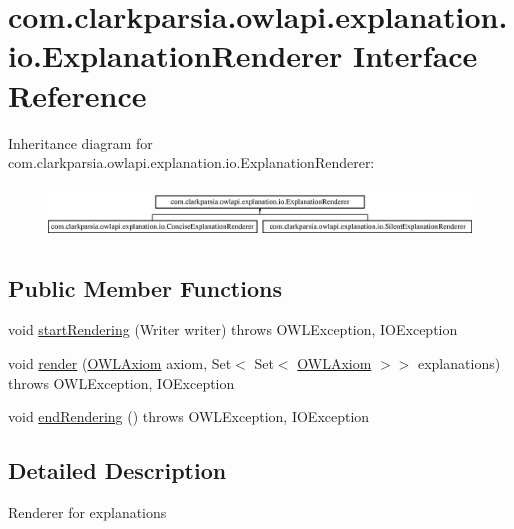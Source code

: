 \hypertarget{interfacecom_1_1clarkparsia_1_1owlapi_1_1explanation_1_1io_1_1_explanation_renderer}{\section{com.\-clarkparsia.\-owlapi.\-explanation.\-io.\-Explanation\-Renderer Interface Reference}
\label{interfacecom_1_1clarkparsia_1_1owlapi_1_1explanation_1_1io_1_1_explanation_renderer}
}
Inheritance diagram for com.\-clarkparsia.\-owlapi.\-explanation.\-io.\-Explanation\-Renderer\-:\begin{figure}[H]
\begin{center}
\leavevmode
\includegraphics[height=1.400000cm]{interfacecom_1_1clarkparsia_1_1owlapi_1_1explanation_1_1io_1_1_explanation_renderer}
\end{center}
\end{figure}
\subsection*{Public Member Functions}
\begin{DoxyCompactItemize}
\item 
void \hyperlink{interfacecom_1_1clarkparsia_1_1owlapi_1_1explanation_1_1io_1_1_explanation_renderer_ac9cc604e6a0e148f2e2ceb305694651a}{start\-Rendering} (Writer writer)  throws O\-W\-L\-Exception, I\-O\-Exception
\item 
void \hyperlink{interfacecom_1_1clarkparsia_1_1owlapi_1_1explanation_1_1io_1_1_explanation_renderer_aa3ad85b6087301d6ff3f4473bae1afda}{render} (\hyperlink{interfaceorg_1_1semanticweb_1_1owlapi_1_1model_1_1_o_w_l_axiom}{O\-W\-L\-Axiom} axiom, Set$<$ Set$<$ \hyperlink{interfaceorg_1_1semanticweb_1_1owlapi_1_1model_1_1_o_w_l_axiom}{O\-W\-L\-Axiom} $>$$>$ explanations)  throws O\-W\-L\-Exception, I\-O\-Exception
\item 
void \hyperlink{interfacecom_1_1clarkparsia_1_1owlapi_1_1explanation_1_1io_1_1_explanation_renderer_a102885719c3fb3ea77607086aa0e30f5}{end\-Rendering} ()  throws O\-W\-L\-Exception, I\-O\-Exception
\end{DoxyCompactItemize}


\subsection{Detailed Description}
Renderer for explanations 


